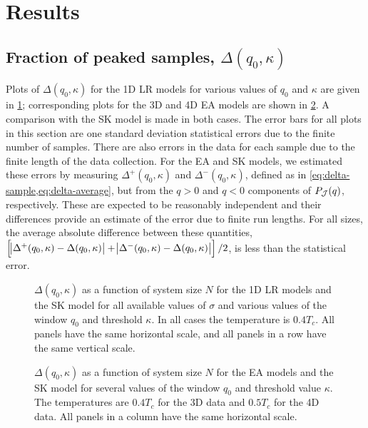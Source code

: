 

\section{Results}

\subsection{Fraction of peaked samples, $\Delta(q_0,\kappa)$}
\label{sec:overlap-results-delta}

Plots of $\Delta(q_0,\kappa)$ for the 1D LR models for various values of $q_0$
and $\kappa$ are given in \cref{fig:delta-1dlr}; corresponding plots for the 3D
and 4D EA models are shown in \cref{fig:delta-ea}. A comparison with the SK
model is made in both cases. The error bars for all plots in this section are
one standard deviation statistical errors due to the finite number of samples.
There are also errors in the data for each sample due to the finite length of
the data collection. For the EA and SK models, we estimated these errors by
measuring $\Delta^+(q_0,\kappa)$ and $\Delta^-(q_0,\kappa)$, defined as in
\cref{eq:delta-sample,eq:delta-average}, but from the $q>0$ and $q<0$
components of $P_{\mathcal{J}}(q)$, respectively. These are expected to be
reasonably independent and their differences provide an estimate of the error
due to finite run lengths. For all sizes, the average absolute difference
between these quantities,
$\left[\abs{\Delta^+(q_0,\kappa)-\Delta(q_0,\kappa)}
     +\abs{\Delta^-(q_0,\kappa)-\Delta(q_0,\kappa)}\right]/2$,
is less than the statistical error.
\begin{figure}
  \centering
  
  \caption[
    Peak-counting statistic $\Delta(q_0,\kappa)$ for one-dimensional long-range
    spin glasses and the Sherrington-Kirckpatrick model.
  ]
  {
    $\Delta(q_0,\kappa)$ as a function of system size $N$ for the 1D LR
    models and the SK model for all available values of $\sigma$ and various
    values of the window $q_0$ and threshold $\kappa$. In all cases the
    temperature is $0.4 T_c$. All panels have the same horizontal scale, and
    all panels in a row have the same vertical scale.
  }
  \label{fig:delta-1dlr}
\end{figure}

\begin{figure}
  \centering
  
  \caption[
    Peak-counting statistic $\Delta(q_0,\kappa)$ for the three- and
    four-dimensional Edwards-Anderson models and the Sherrington-Kirkpatrick
    model.
  ]
  {
    $\Delta(q_0,\kappa)$ as a function of system size $N$ for the EA models and
    the SK model for several values of the window $q_0$ and threshold value
    $\kappa$. The temperatures are $0.4 T_c$ for the 3D data and $0.5 T_c$ for
    the 4D data. All panels in a column have the same horizontal scale.
  }
  \label{fig:delta-ea}
\end{figure}

